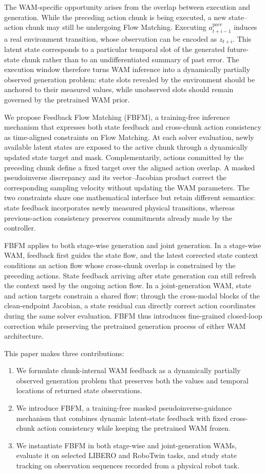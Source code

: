 The WAM-specific opportunity arises from the overlap between execution and
generation. While the preceding action chunk is being executed, a new state--action
chunk may still be undergoing Flow Matching. Executing
$a_{t+i-1}^{\mathrm{prev}}$ induces a real environment transition, whose
observation can be encoded as $z_{t+i}$. This latent state corresponds to a
particular temporal slot of the generated future-state chunk rather than to an
undifferentiated summary of past error. The execution window therefore turns WAM
inference into a dynamically partially observed generation problem: state slots
revealed by the environment should be anchored to their measured values, while
unobserved slots should remain governed by the pretrained WAM prior.

We propose Feedback Flow Matching (FBFM), a training-free inference mechanism that
expresses both state feedback and cross-chunk action consistency as time-aligned
constraints on Flow Matching. At each solver evaluation, newly available latent
states are exposed to the active chunk through a dynamically updated state target
and mask. Complementarily, actions committed by the preceding chunk define a fixed
target over the aligned action overlap. A masked pseudoinverse discrepancy and its
vector--Jacobian product correct the corresponding sampling velocity without
updating the WAM parameters. The two constraints share one mathematical interface
but retain different semantics: state feedback incorporates newly measured
physical transitions, whereas previous-action consistency preserves commitments
already made by the controller.

FBFM applies to both stage-wise generation and joint generation. In a stage-wise
WAM, feedback first guides the state flow, and the latest corrected state context
conditions an action flow whose cross-chunk overlap is constrained by the preceding
actions. State feedback arriving after state generation can still refresh the
context used by the ongoing action flow. In a joint-generation WAM, state and
action targets constrain a shared flow; through the cross-modal blocks of the
clean-endpoint Jacobian, a state residual can directly correct action coordinates
during the same solver evaluation. FBFM thus introduces fine-grained closed-loop
correction while preserving the pretrained generation process of either WAM
architecture.

This paper makes three contributions:
\begin{enumerate}
    \item We formulate chunk-internal WAM feedback as a dynamically partially
    observed generation problem that preserves both the values and temporal
    locations of returned state observations.
    \item We introduce FBFM, a training-free masked pseudoinverse-guidance mechanism
    that combines dynamic latent-state feedback with fixed cross-chunk action
    consistency while keeping the pretrained WAM frozen.
    \item We instantiate FBFM in both stage-wise and joint-generation WAMs,
    evaluate it on selected LIBERO and RoboTwin tasks, and study state tracking
    on observation sequences recorded from a physical robot task.
\end{enumerate}

